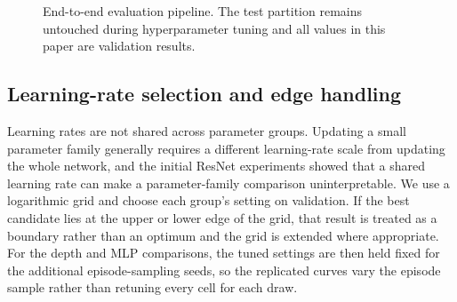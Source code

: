 \documentclass[11pt]{article}
\begin{document}
\begin{figure}[t]
\centering
{}
\caption{End-to-end evaluation pipeline. The test partition remains untouched during hyperparameter tuning and all values in this paper are validation results.}
\label{fig:pipeline}
\end{figure}

\subsection{Learning-rate selection and edge handling}

Learning rates are not shared across parameter groups. Updating a small parameter family generally requires a different learning-rate scale from updating the whole network, and the initial ResNet experiments showed that a shared learning rate can make a parameter-family comparison uninterpretable. We use a logarithmic grid and choose each group's setting on validation. If the best candidate lies at the upper or lower edge of the grid, that result is treated as a boundary rather than an optimum and the grid is extended where appropriate. For the depth and MLP comparisons, the tuned settings are then held fixed for the additional episode-sampling seeds, so the replicated curves vary the episode sample rather than retuning every cell for each draw.
\end{document}
